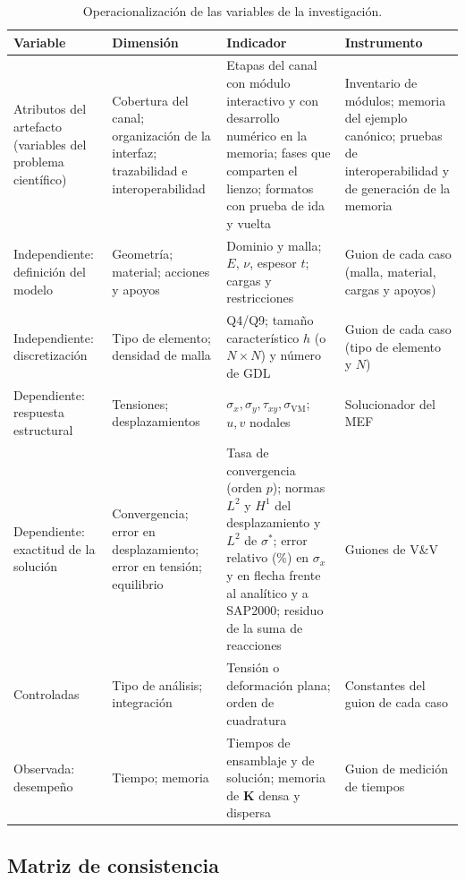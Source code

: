 \begin{table}[htbp]
\centering
\caption{Operacionalización de las variables de la investigación.}
\label{tab:variables}
\begin{tabular}{@{}p{2.7cm}p{3.2cm}p{5.1cm}p{2.5cm}@{}}
\toprule
\textbf{Variable} & \textbf{Dimensión} & \textbf{Indicador} & \textbf{Instrumento} \\
\midrule
Atributos del artefacto (variables del problema científico) & Cobertura del canal; organización de la interfaz; trazabilidad e interoperabilidad & Etapas del canal con módulo interactivo y con desarrollo numérico en la memoria; fases que comparten el lienzo; formatos con prueba de ida y vuelta & Inventario de módulos; memoria del ejemplo canónico; pruebas de interoperabilidad y de generación de la memoria \\
Independiente: definición del modelo & Geometría; material; acciones y apoyos & Dominio y malla; $E$, $\nu$, espesor $t$; cargas y restricciones & Guion de cada caso (malla, material, cargas y apoyos) \\
Independiente: discretización & Tipo de elemento; densidad de malla & Q4/Q9; tamaño característico $h$ (o $N\times N$) y número de GDL & Guion de cada caso (tipo de elemento y $N$) \\
Dependiente: respuesta estructural & Tensiones; desplazamientos & $\sigma_x,\sigma_y,\tau_{xy},\sigma_{\mathrm{VM}}$; $u,v$ nodales & Solucionador del MEF \\
Dependiente: exactitud de la solución & Convergencia; error en desplazamiento; error en tensión; equilibrio & Tasa de convergencia (orden $p$); normas $L^2$ y $H^1$ del desplazamiento y $L^2$ de $\sigma^*$; error relativo (\%) en $\sigma_x$ y en flecha frente al analítico y a SAP2000; residuo de la suma de reacciones & Guiones de V\&V \\
Controladas & Tipo de análisis; integración & Tensión o deformación plana; orden de cuadratura & Constantes del guion de cada caso \\
Observada: desempeño & Tiempo; memoria & Tiempos de ensamblaje y de solución; memoria de $\bm{K}$ densa y dispersa & Guion de medición de tiempos \\
\bottomrule
\end{tabular}
\end{table}

\subsection{Matriz de consistencia}
\label{sec:matriz-consistencia}

